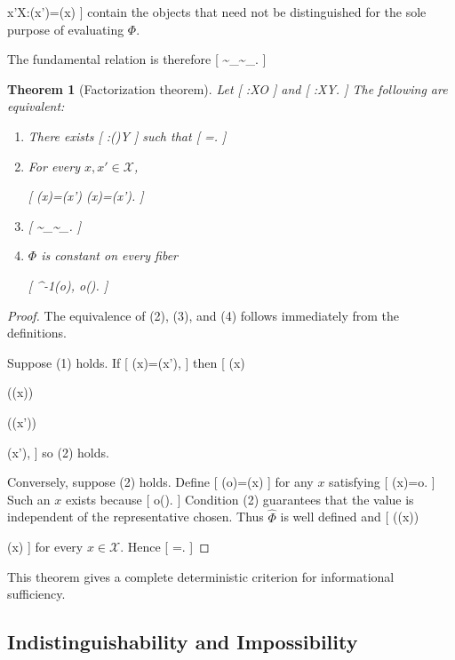 \documentclass[11pt]{article}
\newtheorem{theorem}{Theorem} \newtheorem{proposition}{Proposition} \newtheorem{lemma}{Lemma} \newtheorem{corollary}{Corollary} \newtheorem{definition}{Definition} \newtheorem{remark}{Remark}
\begin{document}
{x'\in\mathcal X:\Phi(x')=\Phi(x)}
]
contain the objects that need not be distinguished for the sole purpose of evaluating $\Phi$.

The fundamental relation is therefore
[
\sim_\pi\subseteq\sim_\Phi.
]

\begin{theorem}[Factorization theorem]
Let
[
\pi:\mathcal X\to\mathcal O
]
and
[
\Phi:\mathcal X\to\mathcal Y.
]
The following are equivalent:

\begin{enumerate}
\item There exists
[
\widehat{\Phi}:\Img(\pi)\to\mathcal Y
]
such that
[
\Phi=\widehat{\Phi}\circ\pi.
]

\item For every $x,x'\in\mathcal X$,

[
\pi(x)=\pi(x')
\Longrightarrow
\Phi(x)=\Phi(x').
]

\item

[
\sim_\pi\subseteq\sim_\Phi.
]

\item $\Phi$ is constant on every fiber

[
\pi^{-1}(o),
\qquad
o\in\Img(\pi).
]
\end{enumerate}
\end{theorem}

\begin{proof}
The equivalence of (2), (3), and (4) follows immediately from the definitions.

Suppose (1) holds. If
[
\pi(x)=\pi(x'),
]
then
[
\Phi(x)

\widehat{\Phi}(\pi(x))

\widehat{\Phi}(\pi(x'))

\Phi(x'),
]
so (2) holds.

Conversely, suppose (2) holds. Define
[
\widehat{\Phi}(o)=\Phi(x)
]
for any $x$ satisfying
[
\pi(x)=o.
]
Such an $x$ exists because
[
o\in\Img(\pi).
]
Condition (2) guarantees that the value is independent of the representative chosen. Thus $\widehat{\Phi}$ is well defined and
[
\widehat{\Phi}(\pi(x))

\Phi(x)
]
for every $x\in\mathcal X$. Hence
[
\Phi=\widehat{\Phi}\circ\pi.
]
\end{proof}

This theorem gives a complete deterministic criterion for informational sufficiency.

\subsection{Indistinguishability and Impossibility}
\end{document}
